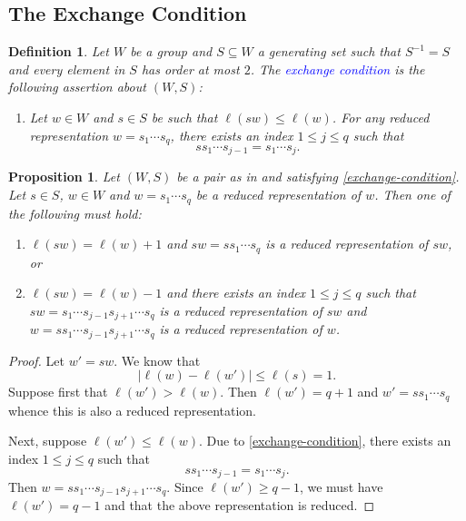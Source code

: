 \documentclass{article}
\theoremstyle{thmstyle}
\newtheorem{proposition}[theorem]{Proposition}
\theoremstyle{defstyle}
\newtheorem{definition}[theorem]{Definition}
\newcommand{\define}[1]{\textcolor{blue}{\textit{#1}}}
\renewcommand{\le}{\leqslant}
\renewcommand{\ge}{\geqslant}
\begin{document}
\subsection{The Exchange Condition}
\begin{definition}
    Let $W$ be a group and $S\subseteq W$ a generating set such that $S^{-1} = S$ and every element in $S$ has order at most $2$. The \define{exchange condition} is the following assertion about $(W, S)$:
    \begin{enumerate}[label=(Exc)]
        \item Let $w\in W$ and $s\in S$ be such that $\ell(sw)\le\ell(w)$. For any reduced representation $w = s_1\cdots s_q$, there exists an index $1\le j\le q$ such that 
        \begin{equation*}
            ss_1\cdots s_{j - 1} = s_1\cdots s_j.
        \end{equation*}
        \label{exchange-condition}
    \end{enumerate}
\end{definition}

\begin{proposition}
    Let $(W, S)$ be a pair as in  and satisfying \ref{exchange-condition}. Let $s\in S$, $w\in W$ and $w = s_1\cdots s_q$ be a reduced representation of $w$. Then one of the following must hold: 
    \begin{enumerate}[label=(\roman*)]
        \item $\ell(sw) = \ell(w) + 1$ and $sw = ss_1\cdots s_q$ is a reduced representation of $sw$, or 
        \item $\ell(sw) = \ell(w) - 1$ and there exists an index $1\le j\le q$ such that $sw = s_1\cdots s_{j - 1}s_{j + 1}\cdots s_q$ is a reduced representation of $sw$ and $w = ss_1\cdots s_{j - 1}s_{j + 1}\cdots s_q$ is a reduced representation of $w$.
    \end{enumerate}
\end{proposition}
\begin{proof}
    Let $w' = sw$. We know that 
    \begin{equation*}
        \left|\ell(w) - \ell(w')\right|\le\ell(s) = 1.
    \end{equation*}
    Suppose first that $\ell(w') > \ell(w)$. Then $\ell(w') = q + 1$ and $w' = ss_1\cdots s_q$ whence this is also a reduced representation.

    Next, suppose $\ell(w')\le\ell(w)$. Due to \ref{exchange-condition}, there exists an index $1\le j\le q$ such that 
    \begin{equation*}
        ss_1\cdots s_{j - 1} = s_1\cdots s_j.
    \end{equation*}
    Then $w = ss_1\cdots s_{j - 1}s_{j + 1}\cdots s_q$. Since $\ell(w')\ge q - 1$, we must have $\ell(w') = q - 1$ and that the above representation is reduced.
\end{proof}
\end{document}
